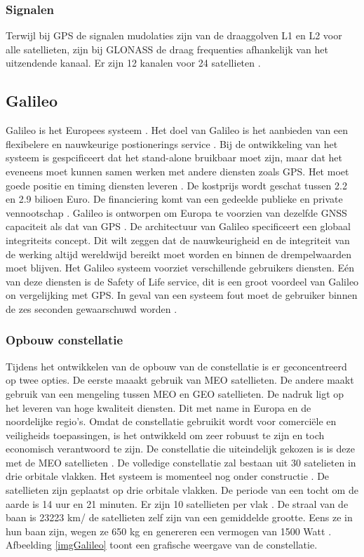 \subsubsection{Signalen}
Terwijl bij GPS de signalen mudolaties zijn van de draaggolven L1 en L2 voor alle satellieten, zijn bij GLONASS de draag frequenties afhankelijk van het uitzendende kanaal. Er zijn 12 kanalen voor 24 satellieten \cite{LBibGPS3}.  
 
\subsection{Galileo}
\label{LGal}
Galileo is het Europees systeem \cite{LBibGNSS3}\cite{LBibGNSS4}. Het doel van Galileo is het aanbieden van een flexibelere en nauwkeurige postionerings service \cite{LBibGNSS4}. Bij de ontwikkeling van het systeem is gespcificeert dat het stand-alone bruikbaar moet zijn, maar dat het eveneens moet kunnen samen werken met andere diensten zoals GPS. Het moet goede positie en timing diensten leveren \cite{LBibGalileo2}. De kostprijs wordt geschat tussen 2.2 en 2.9 bilioen Euro. De financiering komt van een gedeelde publieke en private vennootschap \cite{LBibGNSS8}. Galileo is ontworpen om Europa te voorzien van dezelfde GNSS capaciteit als dat van GPS \cite{LBibGNSS6}. De architectuur van Galileo specificeert een globaal integriteits concept. Dit wilt zeggen dat de nauwkeurigheid en de integriteit van de werking altijd wereldwijd bereikt moet worden en binnen de drempelwaarden moet blijven.  Het Galileo systeem voorziet verschillende gebruikers diensten. E\'en van deze diensten is de Safety of Life service, dit is een groot voordeel van Galileo  on vergelijking met GPS. In geval van een systeem fout moet de gebruiker binnen de zes seconden gewaarschuwd worden \cite{LBibGalileo}.

\subsubsection{Opbouw constellatie}
Tijdens het ontwikkelen van de opbouw van de constellatie is er geconcentreerd op twee opties. De eerste maaakt gebruik van MEO satellieten. De andere maakt gebruik van een mengeling tussen MEO en GEO satellieten. De nadruk ligt op het leveren van hoge kwaliteit diensten. Dit met name in Europa en de noordelijke regio's. Omdat de constellatie gebruikit wordt voor comerci\"ele en veiligheids toepassingen, is het ontwikkeld om zeer robuust te zijn en toch economisch verantwoord te zijn.  De constellatie die uiteindelijk gekozen is is deze met de MEO satellieten \cite{LBibGalileo2}. De volledige constellatie zal bestaan  uit 30 satelieten in drie orbitale vlakken. Het systeem is momenteel nog onder constructie \cite{LBibGNSS4}. De satellieten zijn geplaatst op drie orbitale vlakken. De periode van een tocht om de aarde is 14 uur en 21 minuten. Er zijn 10 satellieten per vlak \cite{LBibGNSS6}. De straal van de baan is 23223 km/ de satellieten zelf zijn van een gemiddelde grootte. Eens ze in hun baan zijn, wegen ze 650 kg en genereren een vermogen van 1500 Watt \cite{LBibGalileo2}.  Afbeelding \ref{imgGalileo} toont een grafische weergave van de constellatie.

